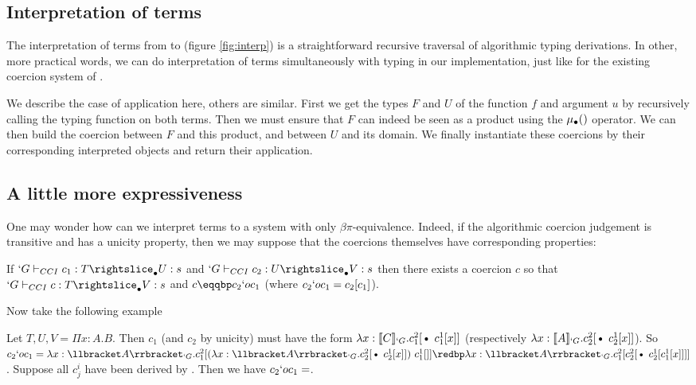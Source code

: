 \documentclass{llncs}
\begin{document}
\subsection{Interpretation of terms}
The interpretation of terms from \Russell to \CCq (figure
\vref{fig:interp}) is a straightforward
recursive traversal of algorithmic typing derivations. In other, more
practical words, we can do interpretation of terms simultaneously with
typing in our implementation, just like for the existing coercion system
of \Coq. 


We describe the case of application here, others are similar. First we
get the types $F$ and $U$ of the function $f$ and argument $u$ by recursively calling the
typing function on both terms. Then we must ensure that $F$ can indeed
be seen as a product using the $\mualgo$ operator. We can then build
the coercion between $F$ and this product, and between $U$ and its
domain. We finally instantiate these coercions by their corresponding
interpreted objects and return their application.

\subsection{A little more expressiveness}
One may wonder how can we interpret \Russell terms to a system with only
$\beta\pi$-equivalence. Indeed, if the algorithmic coercion judgement is transitive
and has a unicity property, then we may suppose that the coercions
themselves have corresponding properties:
\begin{proposition}
  If $\subimpl{`G}{c_1}{T}{U}{s}$ and $\subimpl{`G}{c_2}{U}{V}{s}$ then
  there exists a coercion $c$ so that $\subimpl{`G}{c}{T}{V}{s}$ and $c
  \eqqbp c_2 `o c_1$ (where $c_2 `o c_1 = c_2[c_1]$).
\end{proposition}

Now take the following example
\begin{example}
  Let $T, U, V = \Pi x : A.B$.
  Then $c_1$ (and $c_2$ by unicity) must have the form $\lambda x :
  \ip{C}{`G}.c^2_1[\ctxdot~c^1_1[x]]$ (respectively $\lambda x : \ip{A}{`G}.c^2_2[\ctxdot~c^1_2[x]]$).
  So $c_2 `o c_1 = \lambda x : \ip{A}{`G}. c^2_1[(\lambda x :
  \ip{A}{`G}.c^2_2[\ctxdot~c^1_2[x]])~c^1_1[]] \redbp \lambda x :
  \ip{A}{`G}. c^2_1[c^2_2[\ctxdot~c^1_2[c^1_1[x]]]]$.
  Suppose all $c^i_j$ have been derived by . Then we have 
  $c_2 `o c_1 = $.
  

\end{example}
\end{document}
